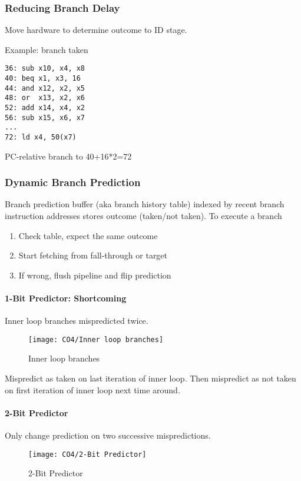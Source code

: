 \subsubsection{Reducing Branch Delay}
Move hardware to determine outcome to ID stage. 

Example: branch taken
\begin{lstlisting}[language={[x86masm]Assembler}]
36: sub x10, x4, x8
40: beq x1, x3, 16
44: and x12, x2, x5
48: or  x13, x2, x6
52: add x14, x4, x2
56: sub x15, x6, x7
...
72: ld x4, 50(x7)
\end{lstlisting}
PC-relative branch to 40+16*2=72

\subsubsection{Dynamic Branch Prediction}

Branch prediction buffer (aka branch history table) indexed by recent branch instruction addresses stores outcome (taken/not taken). To execute a branch
\begin{enumerate}\small
    \item Check table, expect the same outcome
    \item Start fetching from fall-through or target
    \item If wrong, flush pipeline and flip prediction
\end{enumerate}

\paragraph{1-Bit Predictor: Shortcoming}
Inner loop branches mispredicted twice. 

\begin{figure}[!htb]
    \centering
    \texttt{[image: CO4/Inner loop branches]}
    \caption{Inner loop branches}
\end{figure}

Mispredict as taken on last iteration of inner loop. Then mispredict as not taken on first iteration of inner loop next time around. 

\paragraph{2-Bit Predictor}
Only change prediction on two successive mispredictions. 

\begin{figure}[!htb]
    \centering
    \texttt{[image: CO4/2-Bit Predictor]}
    \caption{2-Bit Predictor}
\end{figure}

